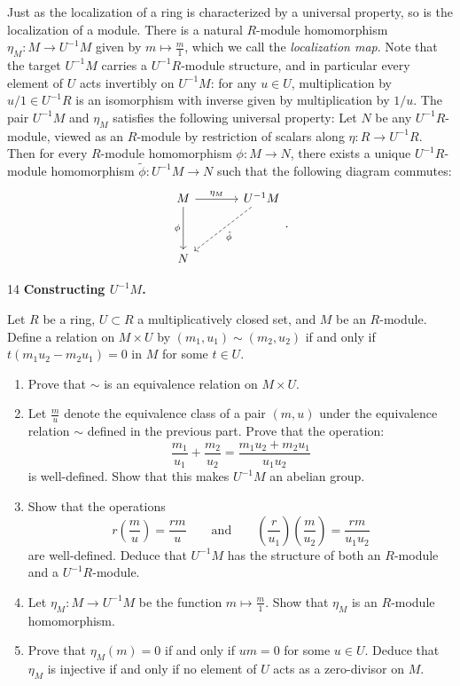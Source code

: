 \documentclass[Notebook.tex]{subfiles}
\begin{document}
Just as the localization of a ring is characterized by a universal property, so is the localization of a module. There is a natural $R$-module homomorphism $\eta_{M}: M\to U^{-1}M$ given by $m\mapsto \frac{m}{1}$, which we call the \emph{localization map}. Note that the target $U^{-1}M$ carries a $U^{-1}R$-module structure, and in particular every element of $U$ acts invertibly on $U^{-1}M$: for any $u\in U$, multiplication by $u/1\in U^{-1}R$ is an isomorphism with inverse given by multiplication by $1/u$. The pair $U^{-1}M$ and $\eta_{M}$ satisfies the following universal property: Let $N$ be any $U^{-1}R$-module, viewed as an $R$-module by restriction of scalars along $\eta: R\to U^{-1}R$. Then for every $R$-module homomorphism $\phi: M\to N$, there exists a unique $U^{-1}R$-module homomorphism $\tilde{\phi}: U^{-1}M\to N$ such that the following diagram commutes:
\[
\begin{tikzcd}[row sep = 3.5em, column sep = 3.5em]
M \arrow[r, "\eta_{M}"] \arrow[d, "\phi"'] & U^{-1}M \arrow[dl, dashed, "\tilde{\phi}"] \\
N &
\end{tikzcd}.
\]

\hrulefill

\newpage 

\begin{problem}{14}
	\textbf{Constructing $U^{-1}M$.} 
	
	Let $R$ be a ring, $U \subset R$ a multiplicatively closed set, and $M$ be an $R$-module. Define a relation on $M\times U$ by $(m_{1},u_{1}) \sim (m_{2},u_{2})$ if and only if $t(m_1u_{2}-m_{2}u_{1})=0$ in $M$ for some $t\in U$. 
	\begin{enumerate}
		\item Prove that $\sim$ is an equivalence relation on $M\times U$. 
		\item Let $\frac{m}{u}$ denote the equivalence class of a pair $(m,u)$ under the equivalence relation $\sim$ defined in the previous part. Prove that the operation:
		\[
		\frac{m_1}{u_1}+\frac{m_2}{u_2} = \frac{m_1u_{2}+m_{2}u_{1}}{u_1u_2}
		\]
		is well-defined. Show that this makes $U^{-1}M$ an abelian group.
		\item Show that the operations 
		\[
		r \left(\frac{m}{u}\right)=\frac{rm}{u} \quad \quad \text{and} \quad \quad \left(\frac{r}{u_1}\right)\left(\frac{m}{u_2}\right)=\frac{rm}{u_1u_2} 
		\]
		are well-defined. Deduce that $U^{-1}M$ has the structure of both an $R$-module and a $U^{-1}R$-module.
		\item Let $\eta_M:M\to U^{-1}M$ be the function $m\mapsto \frac{m}{1}$. Show that $\eta_M$ is an $R$-module homomorphism. 
		\item Prove that $\eta_M(m)=0$ if and only if $um=0$ for some $u\in U$. Deduce that $\eta_M$ is injective if and only if no element of $U$ acts as a zero-divisor on $M$.
	\end{enumerate}
\end{problem}
\end{document}
